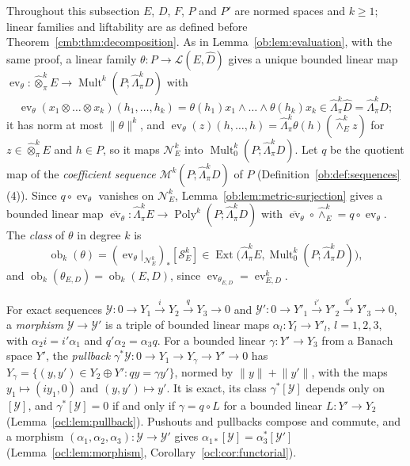 \documentclass[11pt]{amsart}
\theoremstyle{definition}
\theoremstyle{remark}
\numberwithin{equation}{section}
\newcommand{\cL}{\mathcal L}
\newcommand{\Mult}{\operatorname{Mult}}
\newcommand{\norm}[1]{\lVert #1\rVert}
\theoremstyle{plain}
\theoremstyle{definition}
\theoremstyle{plain}
\newcommand{\ev}{\operatorname{ev}}
\newcommand{\ob}{\operatorname{ob}}
\newcommand{\Ext}{\operatorname{Ext}}
\newcommand{\Poly}{\operatorname{Poly}}
\newcommand{\cN}{\mathcal N}
\newcommand{\cS}{\mathcal S}
\newcommand{\cM}{\mathcal M}
\begin{document}
Throughout this subsection $E$, $D$, $F$, $P$ and $P'$ are normed spaces and $k\ge1$; linear families and liftability
are as defined before Theorem~\ref{cmb:thm:decomposition}. As in Lemma~\ref{ob:lem:evaluation}, with the same proof, a
linear family $\theta\colon P\to\cL(E,\widehat D)$ gives a unique bounded linear map
$\ev_\theta\colon\widehat\otimes^k_\pi E\to\Mult^k(P;\widehat\Lambda^k_\pi D)$ with
\[
 \ev_\theta(x_1\otimes\dots\otimes x_k)(h_1,\dots,h_k)=\theta(h_1)x_1\wedge\dots\wedge\theta(h_k)x_k
 \in\widehat\Lambda^k_\pi\widehat D=\widehat\Lambda^k_\pi D;
\]
it has norm at most $\norm\theta^k$, and
$\ev_\theta(z)(h,\dots,h)=\widehat\Lambda^k_\pi\theta(h)(\widehat\wedge^k_Ez)$ for $z\in\widehat\otimes^k_\pi E$ and $h\in P$,
so it maps $\cN^k_E$ into $\Mult^k_0(P;\widehat\Lambda^k_\pi D)$. Let $q$ be the quotient map of the \emph{coefficient
sequence} $\cM^k(P;\widehat\Lambda^k_\pi D)$ of $P$ (Definition~\ref{ob:def:sequences}(4)). Since $q\circ\ev_\theta$
vanishes on $\cN^k_E$, Lemma~\ref{ob:lem:metric-surjection} gives a bounded linear map
$\overline{\ev}_\theta\colon\widehat\Lambda^k_\pi E\to\Poly^k(P;\widehat\Lambda^k_\pi D)$ with
$\overline{\ev}_\theta\circ\widehat\wedge^k_E=q\circ\ev_\theta$. The \emph{class} of $\theta$ in degree $k$ is
\begin{equation}\label{cmb:eq:family-class}
 \ob_k(\theta)=(\ev_\theta|_{\cN^k_E})_*[\cS^k_E]\in\Ext\bigl(\widehat\Lambda^k_\pi E,\Mult^k_0(P;\widehat\Lambda^k_\pi D)\bigr),
\end{equation}
and $\ob_k(\theta_{E,D})=\ob_k(E,D)$, since $\ev_{\theta_{E,D}}=\ev^k_{E,D}$.

For exact sequences $\mathcal Y\colon0\to Y_1\xrightarrow iY_2\xrightarrow qY_3\to0$ and
$\mathcal Y'\colon0\to Y'_1\xrightarrow{i'}Y'_2\xrightarrow{q'}Y'_3\to0$, a \emph{morphism} $\mathcal Y\to\mathcal Y'$ is a
triple of bounded linear maps $\alpha_l\colon Y_l\to Y'_l$, $l=1,2,3$, with $\alpha_2i=i'\alpha_1$ and
$q'\alpha_2=\alpha_3q$. For a bounded linear $\gamma\colon Y'\to Y_3$ from a Banach space $Y'$, the \emph{pullback}
$\gamma^*\mathcal Y\colon0\to Y_1\to Y_\gamma\to Y'\to0$ has $Y_\gamma=\{(y,y')\in Y_2\oplus Y':qy=\gamma y'\}$, normed by
$\norm y+\norm{y'}$, with the maps $y_1\mapsto(iy_1,0)$ and $(y,y')\mapsto y'$. It is exact, its class
$\gamma^*[\mathcal Y]$ depends only on $[\mathcal Y]$, and $\gamma^*[\mathcal Y]=0$ if and only if $\gamma=q\circ L$
for a bounded linear $L\colon Y'\to Y_2$ (Lemma~\ref{ocl:lem:pullback}). Pushouts and pullbacks compose and commute, and a morphism
$(\alpha_1,\alpha_2,\alpha_3)\colon\mathcal Y\to\mathcal Y'$ gives $\alpha_{1*}[\mathcal Y]=\alpha_3^*[\mathcal Y']$
(Lemma~\ref{ocl:lem:morphism}, Corollary~\ref{ocl:cor:functorial}).
\end{document}
